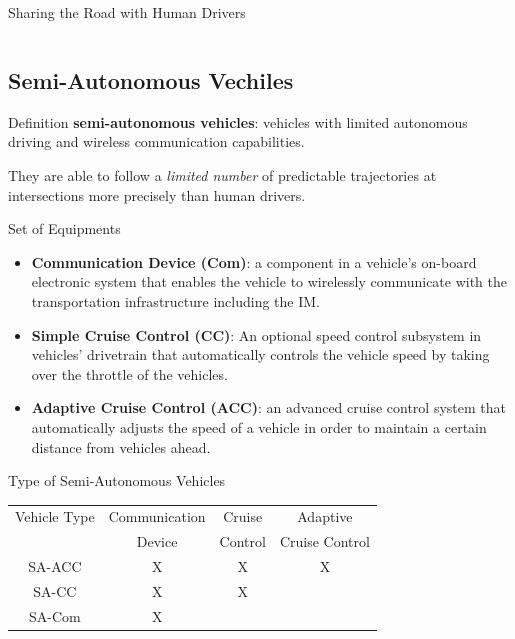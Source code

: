 \documentclass{beamer}
\begin{document}
\begin{frame}{Sharing the Road with Human Drivers}
\begin{columns}[c]
\end{columns}
\end{frame}

\subsection{Semi-Autonomous Vechiles}

\begin{frame}{Definition}
\textbf{semi-autonomous vehicles}: vehicles with limited autonomous
driving and wireless communication capabilities.

\hfill

They are able to follow a \textit{limited number} of predictable
trajectories at intersections more precisely than human drivers.
\end{frame}

\begin{frame}{Set of Equipments}
\begin{itemize}
\item \textbf{Communication Device (Com)}:
a component in a vehicle's on-board electronic system that enables the
vehicle to wirelessly communicate with the transportation
infrastructure including the IM.
\item \textbf{Simple Cruise Control (CC)}:
An optional speed control subsystem in vehicles' drivetrain that
automatically controls the vehicle speed by taking over the throttle
of the vehicles. 
\item \textbf{Adaptive Cruise Control (ACC)}:
an advanced cruise control system that automatically adjusts the speed
of a vehicle in order to maintain a certain distance from vehicles
ahead.
\end{itemize}

\end{frame}

\begin{frame}{Type of Semi-Autonomous Vehicles}
\begin{tabular}{|c|c|c|c|}
  \hline
  Vehicle Type & Communication & Cruise & Adaptive \\
               & Device & Control & Cruise Control \\
  \hline
  SA-ACC & X & X & X  \\
  \hline
  SA-CC & X & X &  \\
  \hline
  SA-Com & X & &  \\
  \hline
\end{tabular}
\end{frame}
\end{document}
